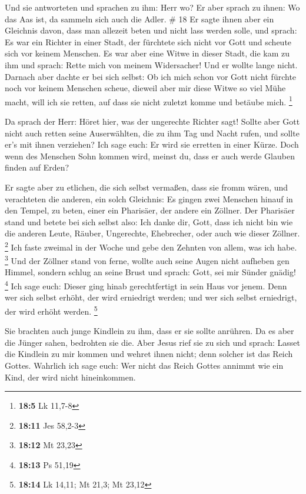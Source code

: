  Und sie antworteten und sprachen zu ihm: Herr wo? Er
aber sprach zu ihnen: Wo das Aas ist, da sammeln sich auch die Adler. \#
18  Er sagte ihnen aber ein Gleichnis davon, dass man
allezeit beten und nicht lass werden solle,  und sprach:
Es war ein Richter in einer Stadt, der fürchtete sich nicht vor Gott und
scheute sich vor keinem Menschen.  Es war aber eine Witwe
in dieser Stadt, die kam zu ihm und sprach: Rette mich von meinem
Widersacher!  Und er wollte lange nicht. Darnach aber
dachte er bei sich selbst: Ob ich mich schon vor Gott nicht fürchte noch
vor keinem Menschen scheue,  dieweil aber mir diese Witwe
so viel Mühe macht, will ich sie retten, auf dass sie nicht zuletzt
komme und betäube mich. \footnote{\textbf{18:5} Lk 11,7-8}

 Da sprach der Herr: Höret hier, was der ungerechte
Richter sagt!  Sollte aber Gott nicht auch retten seine
Auserwählten, die zu ihm Tag und Nacht rufen, und sollte er's mit ihnen
verziehen?  Ich sage euch: Er wird sie erretten in einer
Kürze. Doch wenn des Menschen Sohn kommen wird, meinst du, dass er auch
werde Glauben finden auf Erden?

 Er sagte aber zu etlichen, die sich selbst vermaßen, dass
sie fromm wären, und verachteten die anderen, ein solch Gleichnis:
 Es gingen zwei Menschen hinauf in den Tempel, zu beten,
einer ein Pharisäer, der andere ein Zöllner.  Der
Pharisäer stand und betete bei sich selbst also: Ich danke dir, Gott,
dass ich nicht bin wie die anderen Leute, Räuber, Ungerechte,
Ehebrecher, oder auch wie dieser Zöllner. \footnote{\textbf{18:11} Jes
  58,2-3}  Ich faste zweimal in der Woche und gebe den
Zehnten von allem, was ich habe. \footnote{\textbf{18:12} Mt 23,23}
 Und der Zöllner stand von ferne, wollte auch seine Augen
nicht aufheben gen Himmel, sondern schlug an seine Brust und sprach:
Gott, sei mir Sünder gnädig! \footnote{\textbf{18:13} Ps 51,19}
 Ich sage euch: Dieser ging hinab gerechtfertigt in sein
Haus vor jenem. Denn wer sich selbst erhöht, der wird erniedrigt werden;
und wer sich selbst erniedrigt, der wird erhöht werden. \footnote{\textbf{18:14}
  Lk 14,11; Mt 21,3; Mt 23,12}

 Sie brachten auch junge Kindlein zu ihm, dass er sie
sollte anrühren. Da es aber die Jünger sahen, bedrohten sie die.
 Aber Jesus rief sie zu sich und sprach: Lasset die
Kindlein zu mir kommen und wehret ihnen nicht; denn solcher ist das
Reich Gottes.  Wahrlich ich sage euch: Wer nicht das
Reich Gottes annimmt wie ein Kind, der wird nicht hineinkommen.

